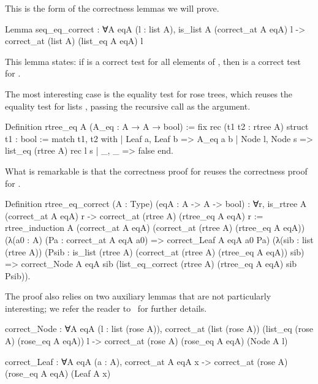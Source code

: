 \documentclass[a4paper, 11pt]{book}
\begin{document}
This is the form of the correctness lemmas we will prove.

\begin{rocqcode}
Lemma seq_eq_correct : ∀A eqA (l : list A),
  is_list A (correct_at A eqA) l ->
    correct_at (list A) (list_eq A eqA) l
\end{rocqcode}

This lemma states: if  is a correct test for all elements of
, then  is a correct test for .

The most interesting case is the equality test for rose trees, which reuses
the equality test for lists , passing the recursive call as the
 argument.

\begin{rocqcode}
Definition rtree_eq A (A_eq : A → A → bool) :=
  fix rec (t1 t2 : rtree A) {struct t1} : bool :=
    match t1, t2 with
    | Leaf a, Leaf b => A_eq a b
    | Node l, Node s => list_eq (rtree A) rec l s
    | _, _ => false
    end.
\end{rocqcode}


What is remarkable is that the correctness proof for 
reuses the correctness proof for .

\begin{rocqcode}
Definition rtree_eq_correct (A : Type) (eqA : A -> A -> bool) :
  ∀r, is_rtree A (correct_at A eqA) r ->
        correct_at (rtree A) (rtree_eq A eqA) r
:=
  rtree_induction
    A (correct_at A eqA) (correct_at (rtree A) (rtree_eq A eqA))
    (λ(a0 : A) (Pa : correct_at A eqA a0) =>
       correct_Leaf A eqA a0 Pa)
    (λ(sib : list (rtree A))
         (Psib : is_list (rtree A)
                   (correct_at (rtree A) (rtree_eq A eqA)) sib) =>
       correct_Node A eqA sib
         (list_eq_correct (rtree A) (rtree_eq A eqA) sib Psib)).
\end{rocqcode}

The proof also relies on two auxiliary lemmas that are not particularly
interesting; we refer the reader to~\cite{tassi:hal-01897468} for further
details.

\begin{rocqcode}
correct_Node : ∀A eqA (l : list (rose A)),
  correct_at (list (rose A)) (list_eq (rose A) (rose_eq A eqA)) l ->
    correct_at (rose A) (rose_eq A eqA) (Node A l)

correct_Leaf : ∀A eqA (a : A),
  correct_at A eqA x ->
    correct_at (rose A) (rose_eq A eqA) (Leaf A x)
\end{rocqcode}
\end{document}
